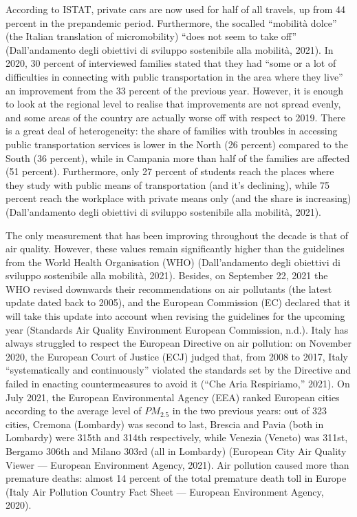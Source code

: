 \documentclass[letterpaper,10pt,english]{jupyterBook}
\begin{document}
\sphinxAtStartPar
According to ISTAT, private cars are now used for half of all travels, up from 44 percent in the pre\sphinxhyphen{}pandemic period. Furthermore, the so\sphinxhyphen{}called “mobilità dolce” (the Italian translation of micro\sphinxhyphen{}mobility) “does not seem to take off” (Dall’andamento degli obiettivi di sviluppo sostenibile alla mobilità, 2021). In 2020, 30 percent of interviewed families stated that they had “some or a lot of difficulties in connecting with public transportation in the area where they live” \sphinxhyphen{} an improvement from the 33 percent of the previous year. However, it is enough to look at the regional level to realise that improvements are not spread evenly, and some areas of the country are actually worse off with respect to 2019. There is a great deal of heterogeneity: the share of families with troubles in accessing public transportation services is lower in the North (26 percent) compared to the South (36 percent), while in Campania more than half of the families are affected (51 percent). Furthermore, only 27 percent of students reach the places where they study with public means of transportation (and it’s declining), while 75 percent reach the workplace with private means only (and the share is increasing) (Dall’andamento degli obiettivi di sviluppo sostenibile alla mobilità, 2021).

\sphinxAtStartPar
The only measurement that has been improving throughout the decade is that of air quality. However, these values remain significantly higher than the guidelines from the World Health Organisation (WHO) (Dall’andamento degli obiettivi di sviluppo sostenibile alla mobilità, 2021). Besides, on September 22, 2021 the WHO revised downwards their recommendations on air pollutants (the latest update dated back to 2005), and the European Commission (EC) declared that it will take this update into account when revising the guidelines for the upcoming year (Standards \sphinxhyphen{} Air Quality \sphinxhyphen{} Environment \sphinxhyphen{} European Commission, n.d.). Italy has always struggled to respect the European Directive on air pollution: on November 2020, the European Court of Justice (ECJ) judged that, from 2008 to 2017, Italy “systematically and continuously” violated the standards set by the Directive and failed in enacting countermeasures to avoid it (“Che Aria Respiriamo,” 2021). On July 2021, the European Environmental Agency (EEA) ranked European cities according to the average level of \(PM_{2.5}\) in the two previous years: out of 323 cities, Cremona (Lombardy) was second to last, Brescia and Pavia (both in Lombardy) were 315th and 314th respectively, while Venezia (Veneto) was 311st, Bergamo 306th and Milano 303rd (all in Lombardy) (European City Air Quality Viewer — European Environment Agency, 2021). Air pollution caused more than  premature deaths: almost 14 percent of the total premature death toll in Europe (Italy \sphinxhyphen{} Air Pollution Country Fact Sheet — European Environment Agency, 2020).
\end{document}
